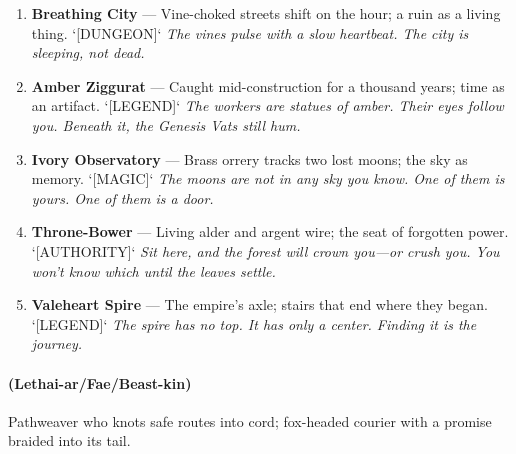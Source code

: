 \begin{enumerate}
  \hfill \textit{The arches have names---carved on the inside. You must walk through to read them.}
\item \textbf{Breathing City} --- Vine-choked streets shift on the hour; a ruin as a living thing. `[DUNGEON]`
  \hfill \textit{The vines pulse with a slow heartbeat. The city is sleeping, not dead.}
\item[J] \textbf{Amber Ziggurat} --- Caught mid-construction for a thousand years; time as an artifact. `[LEGEND]`
  \hfill \textit{The workers are statues of amber. Their eyes follow you. Beneath it, the Genesis Vats still hum.}
\item[Q] \textbf{Ivory Observatory} --- Brass orrery tracks two lost moons; the sky as memory. `[MAGIC]`
  \hfill \textit{The moons are not in any sky you know. One of them is yours. One of them is a door.}
\item[K] \textbf{Throne-Bower} --- Living alder and argent wire; the seat of forgotten power. `[AUTHORITY]`
  \hfill \textit{Sit here, and the forest will crown you---or crush you. You won't know which until the leaves settle.}
\item[A] \textbf{Valeheart Spire} --- The empire's axle; stairs that end where they began. `[LEGEND]`
  \hfill \textit{The spire has no top. It has only a center. Finding it is the journey.}
\end{enumerate}

\paragraph*{(Lethai-ar/Fae/Beast-kin)} Pathweaver who knots safe routes into cord; fox-headed courier with a promise braided into its tail.

